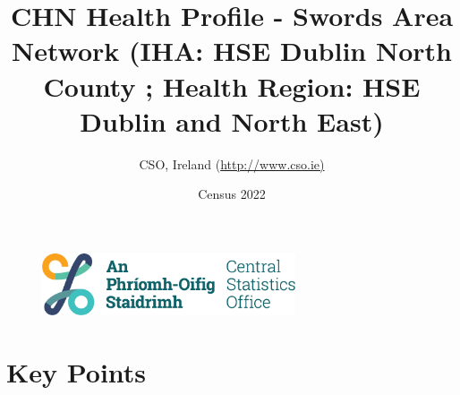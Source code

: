 \documentclass{article}
\title{CHN Health Profile - Swords Area Network (IHA: HSE Dublin North County ;  Health Region: HSE Dublin and North East) }
\date{Census 2022}
\author{CSO, Ireland  (\url{http://www.cso.ie)}}
\begin{document}


\begin{figure}
	\centering
\includegraphics[width =75mm]{../figures/CSO_Logo.png}
\end{figure}

				 
		   
						  
														  
																																													
												 
			 
\maketitle
					
													   
				 
						 
																																																																											   
				 
				  
  \pagebreak
    	    \tableofcontents

\pagebreak


\section{Key Points}
\end{document}
